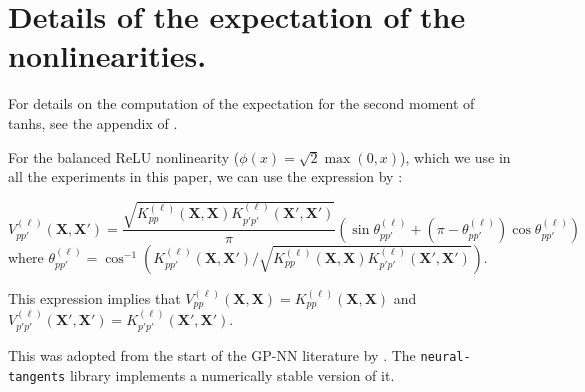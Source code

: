 \documentclass[tablecaption=bottom,wcp,nonatbib]{jmlr} %
\newcommand{\vX}{\mathbf{X}}
\newcommand{\bracket}[3]{{\left#1 #3 \right#2}}
\newcommand{\bra}{\bracket{(}{)}}
\newcommand{\ssup}[1]{^{\bra{#1}}}
\begin{document}
\section{Details of the expectation of the nonlinearities.}
\label{sec:exp-nonlin}
For details on the computation of the expectation for the second moment of 
tanhs, see the appendix of \citep{lee2018dnnlimit}.

For the balanced ReLU nonlinearity ($\phi(x) = \sqrt{2}\max(0, x)$), which we
use in all the experiments in this paper, we can use the expression by \citet{cho2009mkm}:
{
\begin{equation}
  V_{pp'}\ssup{\ell}(\vX, \vX') = \frac{\sqrt{K_{pp}\ssup{\ell}(\vX,\vX)K_{p'p'}\ssup{\ell}(\vX',\vX')}}{\pi} \bra{\sin \theta_{pp'}\ssup{\ell} + (\pi - \theta_{pp'}\ssup{\ell}) \cos \theta_{pp'}\ssup{\ell}}
  \label{eq:nlin-relu}
\end{equation}
where $\theta_{pp'}\ssup{\ell} = \cos^{-1}\left( K_{pp'}\ssup{\ell}(\vX,\vX') /
  \sqrt{K_{pp}\ssup{\ell}(\vX,\vX)K_{p'p'}\ssup{\ell}(\vX',\vX')}\right)$.

This expression implies that $V_{pp}\ssup{\ell}(\vX, \vX) = K_{pp}\ssup{\ell}(\vX,
\vX)$ and $V_{p'p'}\ssup{\ell}(\vX', \vX') = K_{p'p'}\ssup{\ell}(\vX', \vX')$.
}

This was adopted from the start of the GP-NN literature by
\citet{lee2018dnnlimit,matthews2018dnnlimit}. The 
\texttt{neural-tangents} library \citep{neuraltangents2020} implements a
numerically stable version of it.

\end{document}
